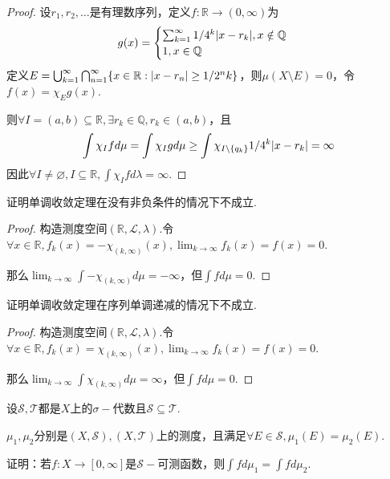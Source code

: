 \begin{proof}
    设\(r_1, r_2, \dots\)是有理数序列，定义\(f: \mathbb{R} \to (0,\infty)\)为
    \begin{align*}
        g(x)=
        \begin{cases}
            \sum_{k=1}^\infty 1/4^k \abs*{x-r_k}, x \notin \mathbb{Q}  \\
            1, x \in \mathbb{Q} 
        \end{cases}
    \end{align*}
    定义\(E=\bigcup_{k=1}^\infty \bigcap_{n=1}^\infty \{x \in \mathbb{R}: \abs*{x-r_n} \geq 1/2^n k\}\)，则\(\mu(X \setminus E)=0\)，令\(f(x)=\chi_E g(x)\).

    则\(\forall I=(a,b) \subseteq \mathbb{R}, \exists r_k \in \mathbb{Q}, r_k \in (a,b)\)，且
    \begin{align*}
        \int \chi_I f d\mu=\int \chi_I g d\mu \geq \int \chi_{I \setminus \{q_k\}} 1/4^k \abs*{x-r_k}=\infty
    \end{align*}
    因此\(\forall I \ne \varnothing, I \subseteq \mathbb{R}, \int \chi_I f d\lambda=\infty\).
\end{proof}

\begin{problem}[13]\label{3.A.13}
    证明单调收敛定理在没有非负条件的情况下不成立.
\end{problem}

\begin{proof}
    构造测度空间\((\mathbb{R}, \mathcal{L}, \lambda)\).令\(\forall x \in \mathbb{R}, f_k(x)=-\chi_{(k,\infty)}(x), \lim_{k \to \infty}f_k(x)=f(x)=0\).

    那么\(\lim_{k \to \infty} \int -\chi_{(k,\infty)} d\mu=-\infty\)，但\(\int f d\mu=0\).
\end{proof}

\begin{problem}[14]\label{3.A.14}
    证明单调收敛定理在序列单调递减的情况下不成立.
\end{problem}

\begin{proof}
    构造测度空间\((\mathbb{R}, \mathcal{L}, \lambda)\).令\(\forall x \in \mathbb{R}, f_k(x)=\chi_{(k,\infty)}(x), \lim_{k \to \infty}f_k(x)=f(x)=0\).

    那么\(\lim_{k \to \infty} \int \chi_{(k,\infty)} d\mu=\infty\)，但\(\int f d\mu=0\).
\end{proof}

\begin{problem}[16]\label{3.A.16}
    设\(\mathcal{S}, \mathcal{T}\)都是\(X\)上的\(\sigma-\)代数且\(\mathcal{S} \subseteq \mathcal{T}\).
    
    \(\mu_1, \mu_2\)分别是\((X, \mathcal{S}), (X, \mathcal{T})\)上的测度，且满足\(\forall E \in \mathcal{S}, \mu_1(E)=\mu_2(E)\).
    
    证明：若\(f: X \to [0, \infty]\)是\(\mathcal{S}-\)可测函数，则\(\int f d\mu_1=\int f d\mu_2\).
\end{problem}

